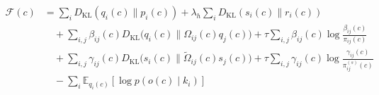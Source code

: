 \documentclass[11pt]{article}
\begin{document}
\begin{equation}
\begin{aligned}
\mathcal{F}(c) &= \sum_i D_{\mathrm{KL}}(q_i(c) \| p_i(c)) + \lambda_h \sum_i D_{\mathrm{KL}}(s_i(c) \| r_i(c)) \\
&\quad + \sum_{i,j} \beta_{ij}(c)  D_{\mathrm{KL}}\big(q_i(c) \big\| \Omega_{ij}(c)q_j(c)\big) + \tau \sum_{i,j} \beta_{ij}(c) \log\frac{\beta_{ij}(c)}{\pi_{ij}(c)} \\
&\quad + \sum_{i,j} \gamma_{ij}(c)  D_{\mathrm{KL}}\big(s_i(c) \big\| \tilde{\Omega}_{ij}(c)s_j(c)\big) + \tau \sum_{i,j} \gamma_{ij}(c) \log\frac{\gamma_{ij}(c)}{\pi^{(s)}_{ij}(c)} \\
&\quad - \sum_i \mathbb{E}_{q_i(c)}[\log p(o(c) \mid k_i)]
\end{aligned}
\label{eq:pointwise_free_energy}
\end{equation}
\end{document}
